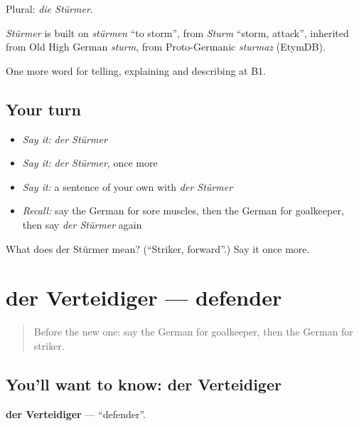 Plural: \emph{die Stürmer}.

\begin{cousinweb}
\emph{Stürmer} is built on \emph{stürmen} \textquotedblleft{}to storm\textquotedblright{}, from \emph{Sturm} \textquotedblleft{}storm, attack\textquotedblright{}, inherited from Old High German \emph{sturm}, from Proto-Germanic \emph{sturmaz} (EtymDB).
\end{cousinweb}

\begin{grammarlens}[title={What you've built}]
One more word for telling, explaining and describing at B1.
\end{grammarlens}

\subsection*{Your turn}
\begin{itemize}
\raggedright
  \item \emph{Say it:} \emph{der Stürmer}
  \item \emph{Say it:} \emph{der Stürmer}, once more
  \item \emph{Say it:} a sentence of your own with \emph{der Stürmer}
  \item \emph{Recall:} say the German for sore muscles, then the German for goalkeeper, then say \emph{der Stürmer} again
\end{itemize}

\begin{tcolorbox}[breakable,colback=teal!4,colframe=teal!35!black,title={Before you move on}]
What does der Stürmer mean? (\textquotedblleft{}Striker, forward\textquotedblright{}.) Say it once more.
\end{tcolorbox}
\section[der Verteidiger]{der Verteidiger — defender}

\label{lesson:GE-C506-verteidiger}



\begin{quote}
Before the new one: say the German for goalkeeper, then the German for striker.
\end{quote}

\subsection*{You'll want to know: der Verteidiger}
\textbf{der Verteidiger} — \textquotedblleft{}defender\textquotedblright{}.


